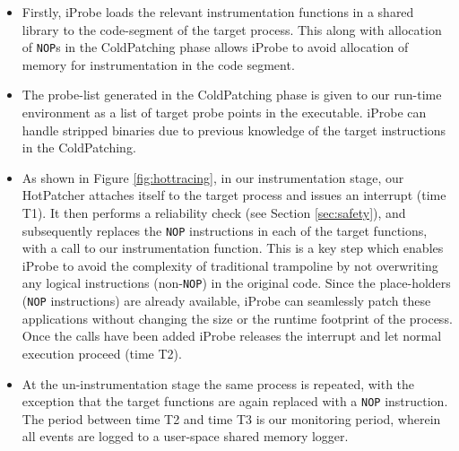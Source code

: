 \begin{itemize}

\item Firstly, iProbe loads the relevant instrumentation functions in a shared library to the code-segment of the target process. 
This along with allocation of \texttt{NOP}s in the ColdPatching phase allows iProbe to avoid allocation of memory for instrumentation in the code segment. 

\item The probe-list generated in the ColdPatching phase is given to our run-time environment as a list of target probe points in the executable. 
iProbe can handle stripped binaries due to previous knowledge of the target instructions in the ColdPatching.

\item As shown in Figure \ref{fig:hottracing}, in our instrumentation stage, 
our HotPatcher attaches itself to the target process and issues an interrupt (time T1). 
It then performs a reliability check (see Section \ref{sec:safety}), 
and subsequently replaces the \texttt{NOP} instructions in each of the target functions, with a call to our instrumentation function. 
This is a key step which enables iProbe to avoid the complexity of traditional trampoline \cite{livepatch,katana} by not overwriting any logical instructions (non-\texttt{NOP}) in the original code. 
Since the place-holders (\texttt{NOP} instructions) are already available, iProbe can seamlessly patch these applications without changing the size or the runtime footprint of the process. 
Once the calls have been added iProbe releases the interrupt and let normal execution proceed (time T2).

\item At the un-instrumentation stage the same process is repeated, with the exception that the target functions are again replaced with a \texttt{NOP} instruction. 
The period between time T2 and time T3 is our monitoring period, wherein all events are logged to a user-space shared memory logger.

\end{itemize}

